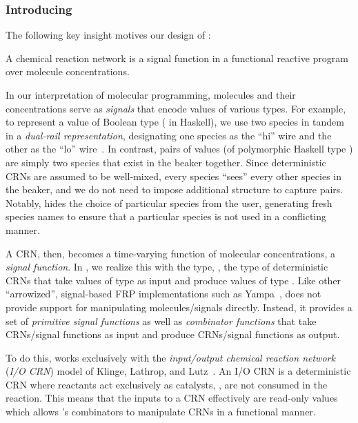 \subsubsection{Introducing \reactamole{}}
The following key insight motives our design of \reactamole{}:
\begin{displayquote}
A chemical reaction network is a signal function in a functional reactive program over molecule concentrations.
\end{displayquote}
In our interpretation of molecular programming, molecules and their concentrations serve as \emph{signals} that encode values of various types.
For example, to represent a value of Boolean type ( in Haskell), we use two species in tandem in a \emph{dual-rail representation}, designating one species as the ``hi'' wire and the other as the ``lo'' wire~\cite{jMagn97,cKlin16,rdc,jKlLaLu20}.
In contrast, pairs of values (of polymorphic Haskell type ) are simply two species that exist in the beaker together.
Since deterministic CRNs are assumed to be well-mixed, every species ``sees'' every other species in the beaker, and we do not need to impose additional structure to capture pairs.
Notably, \reactamole{} hides the choice of particular species from the user, generating fresh species names to ensure that a particular species is not used in a conflicting manner.

A CRN, then, becomes a time-varying function of molecular concentrations, a \emph{signal function}.
In \reactamole, we realize this with the type, , the type of deterministic CRNs that take values of type  as input and produce values of type .
Like other ``arrowized'', signal-based FRP implementations such as Yampa~\cite{dominguez:2018:thesis}, \reactamole{} does not provide support for manipulating molecules/signals directly.
Instead, it provides a set of \emph{primitive signal functions} as well as \emph{combinator functions} that take CRNs/signal functions as input and produce CRNs/signal functions as output.

To do this, \reactamole{} works exclusively with the \emph{input/output chemical reaction network} (\emph{I/O CRN}) model of Klinge, Lathrop, and Lutz~\cite{jKlLaLu20}.
An I/O CRN is a deterministic CRN where reactants act exclusively as catalysts, \ie, are not consumed in the reaction.
This means that the inputs to a CRN effectively are read-only values which allows \reactamole{}'s combinators to manipulate CRNs in a functional manner.

